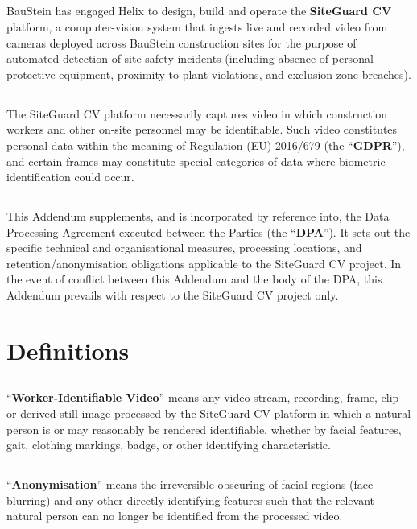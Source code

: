 \documentclass[11pt]{article}
\begin{document}
\subsection{} BauStein has engaged Helix to design, build and operate the \textbf{SiteGuard CV} platform, a computer-vision system that ingests live and recorded video from cameras deployed across BauStein construction sites for the purpose of automated detection of site-safety incidents (including absence of personal protective equipment, proximity-to-plant violations, and exclusion-zone breaches).

\subsection{} The SiteGuard CV platform necessarily captures video in which construction workers and other on-site personnel may be identifiable. Such video constitutes personal data within the meaning of Regulation (EU) 2016/679 (the ``\textbf{GDPR}''), and certain frames may constitute special categories of data where biometric identification could occur.

\subsection{} This Addendum supplements, and is incorporated by reference into, the Data Processing Agreement executed between the Parties (the ``\textbf{DPA}''). It sets out the specific technical and organisational measures, processing locations, and retention/anonymisation obligations applicable to the SiteGuard CV project. In the event of conflict between this Addendum and the body of the DPA, this Addendum prevails with respect to the SiteGuard CV project only.

\section{Definitions}

\subsection{} ``\textbf{Worker-Identifiable Video}'' means any video stream, recording, frame, clip or derived still image processed by the SiteGuard CV platform in which a natural person is or may reasonably be rendered identifiable, whether by facial features, gait, clothing markings, badge, or other identifying characteristic.

\subsection{} ``\textbf{Anonymisation}'' means the irreversible obscuring of facial regions (face blurring) and any other directly identifying features such that the relevant natural person can no longer be identified from the processed video.
\end{document}

